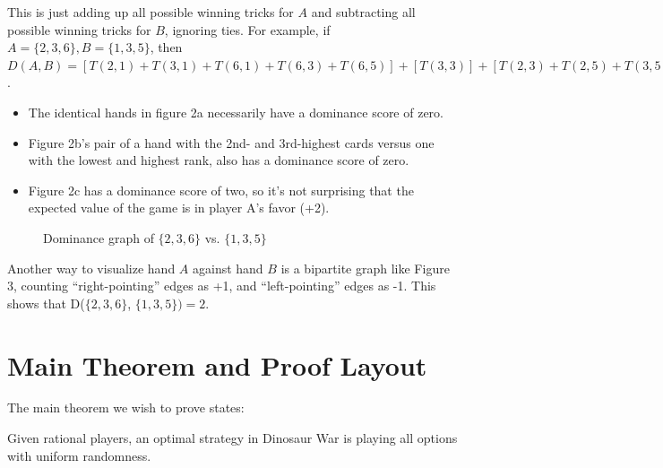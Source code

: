 \documentclass[11pt, oneside]{article} 	%
\begin{document}
This is just adding up all possible winning tricks for $A$ and subtracting all possible winning tricks for $B$, ignoring ties. For example, if $A = \{2, 3,6\}, B = \{1,3,5\}$, then $D(A,B) = [T(2,1) + T(3,1) + T(6,1) + T(6,3) + T(6,5)] + [T(3,3)] +  [T(2,3) + T(2,5) + T(3,5)] = 5 + 0 - 3 = 2$.


\begin{itemize}
\item The identical hands in figure 2a necessarily have a dominance score of zero.
\item Figure 2b's pair of a hand with the 2nd- and 3rd-highest cards versus one with the lowest and highest rank, also has a dominance score of zero.
\item Figure 2c has a dominance score of two, so it's not surprising that the expected value of the game is in player A's favor (+2).
\end{itemize}


\begin{figure}
\centering
{}
\label{fig:bipartite}
\caption{Dominance graph of $\{2,3,6\}$ vs. $\{1,3,5\}$}
\end{figure}

Another way to visualize hand $A$ against hand $B$ is a bipartite graph like Figure 3, counting ``right-pointing'' edges as +1, and ``left-pointing'' edges as -1. This shows that D($\{2,3,6\}$, $\{1,3,5\}) = 2$.



\section{Main Theorem and Proof Layout}

The main theorem we wish to prove states:

\begin{framed}
Given rational players, an optimal strategy in Dinosaur War is playing all options with uniform randomness.
\end{framed}
\end{document}
